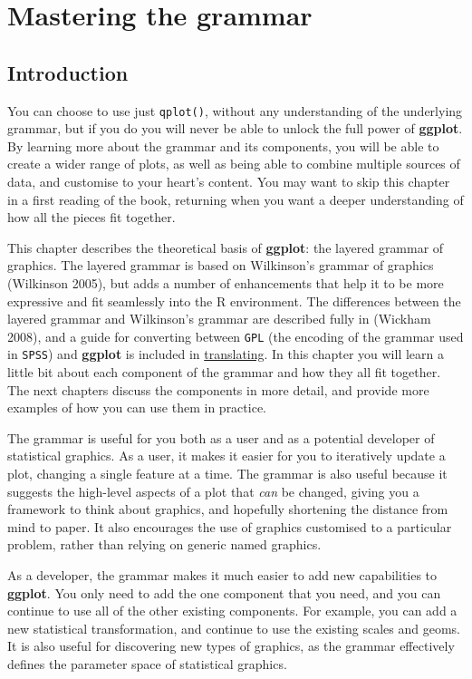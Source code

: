 \chapter{Mastering the grammar}\label{cha:mastery}

\section{Introduction}

You can choose to use just \texttt{qplot()}, without any understanding
of the underlying grammar, but if you do you will never be able to
unlock the full power of \textbf{ggplot}. By learning more about the
grammar and its components, you will be able to create a wider range of
plots, as well as being able to combine multiple sources of data, and
customise to your heart's content. You may want to skip this chapter in
a first reading of the book, returning when you want a deeper
understanding of how all the pieces fit together.

This chapter describes the theoretical basis of \textbf{ggplot}: the
layered grammar of graphics. The layered grammar is based on Wilkinson's
grammar of graphics (Wilkinson 2005), but adds a number of enhancements
that help it to be more expressive and fit seamlessly into the R
environment. The differences between the layered grammar and Wilkinson's
grammar are described fully in (Wickham 2008), and a guide for
converting between \texttt{GPL} (the encoding of the grammar used in
\texttt{SPSS}) and \textbf{ggplot} is included in
\hyperref[cha:translating]{translating}. In this chapter you will learn
a little bit about each component of the grammar and how they all fit
together. The next chapters discuss the components in more detail, and
provide more examples of how you can use them in practice.

The grammar is useful for you both as a user and as a potential
developer of statistical graphics. As a user, it makes it easier for you
to iteratively update a plot, changing a single feature at a time. The
grammar is also useful because it suggests the high-level aspects of a
plot that \emph{can} be changed, giving you a framework to think about
graphics, and hopefully shortening the distance from mind to paper. It
also encourages the use of graphics customised to a particular problem,
rather than relying on generic named graphics.

As a developer, the grammar makes it much easier to add new capabilities
to \textbf{ggplot}. You only need to add the one component that you
need, and you can continue to use all of the other existing components.
For example, you can add a new statistical transformation, and continue
to use the existing scales and geoms. It is also useful for discovering
new types of graphics, as the grammar effectively defines the parameter
space of statistical graphics.


